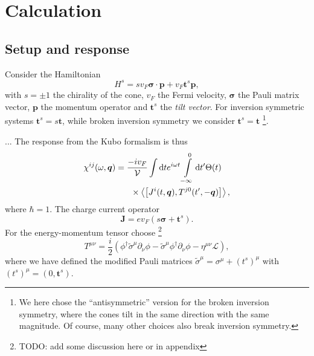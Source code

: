\documentclass[%
 reprint,
 amsmath,amssymb,
 aps,
]{revtex4-2}
\renewcommand\vec\bm  %
\begin{document}
\maketitle

\section{Calculation\label{sec:calculation}}
\subsection{Setup and response}
Consider the Hamiltonian
\begin{equation}
  \label{eq:hamiltonian}
  H^s = s v_F \vec{\sigma} \cdot \vec{p} + v_F \vec{t}^s \vec{p},
\end{equation}
with \( s = \pm 1 \) the chirality of the cone, \( v_F \) the Fermi velocity, \( \vec{\sigma} \) the Pauli matrix vector, \( \vec{p} \) the momentum operator and \( \vec{t}^s \) the \emph{tilt vector}.
For inversion symmetric systems \( \vec{t}^s = s \vec{t} \), while broken inversion symmetry we consider \( \vec{t}^s = \vec{t} \)
\footnote{We here chose the ``antisymmetric'' version for the broken inversion symmetry, where the cones tilt in the same direction with the same magnitude.
Of course, many other choices also break inversion symmetry.}.

...
The response from the Kubo formalism is thus
\begin{equation}
  \label{eq:kubo-response}
  \begin{multlined}
    \chi^{ij}(\omega, \vec{q}) = \frac{-i v_F}{\mathcal{V}}
    \int \mathrm{d} t
    e^{i \omega t}
    \int\limits_{-\infty}^0 \mathrm{d} t'
    \Theta(t)\\
    \times
    \Braket{\left[J^i(t, \vec{q}), T^{j0}(t', -\vec{q})\right]},
  \end{multlined}
\end{equation}
where \( \hbar = 1 \).
The charge current operator
\begin{equation}
  \label{eq:current-op}
  \vec{J} = e v_F (s \vec{\sigma} + \vec{t}^s).
\end{equation}
For the energy-momentum tensor choose
\footnote{TODO: add some discussion here or in appendix}
\begin{equation}
  \label{eq:energy-momentum-tensor}
  T^{\mu\nu} =
  \frac{i}{2} (
  \phi^{\dagger} \tilde{\sigma}^{\mu} \partial_{\nu} \phi
  -\tilde{\sigma} ^{\mu} \phi^{\dagger} \partial_{\nu} \phi
  -\eta^{\mu \nu} \mathcal{L}
  ),
\end{equation}
where we have defined the modified Pauli matrices \( \tilde{\sigma} ^{\mu} = \sigma^{\mu} + (t^s)^{\mu} \) with \( (t^s)^{\mu} = (0, \vec{t}^s) \).
\end{document}
